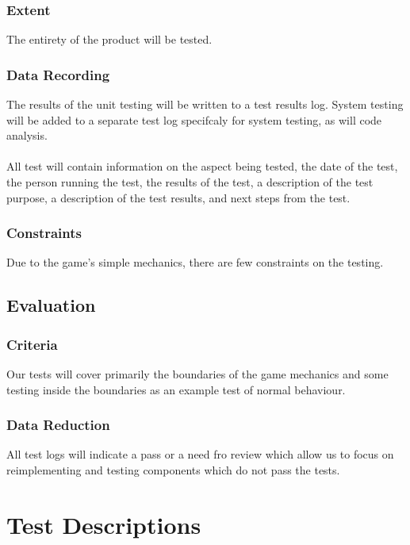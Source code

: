 \documentclass[11pt, oneside]{article}   	%
\begin{document}
\subsubsection*{Extent}
The entirety of the product will be tested.

\subsubsection*{Data Recording}
The results of the unit testing will be written to a test results log. System testing will be added to a separate test log specifcaly for system testing, as will code analysis.\\
\\
All test will contain information on the aspect being tested, the date of the test, the person running the test, the results of the test, a description of the test purpose, a description of the test results, and next steps from the test.

\subsubsection*{Constraints}
Due to the game's simple mechanics, there are few constraints on the testing.

\subsection{Evaluation}
\subsubsection*{Criteria}
Our tests will cover primarily the boundaries of the game mechanics and some testing inside the boundaries as an example test of normal behaviour.

\subsubsection*{Data Reduction}
All test logs will indicate a pass or a need fro review which allow us to focus on reimplementing and testing components which do not pass the tests.

\newpage
\section{Test Descriptions}
\end{document}
